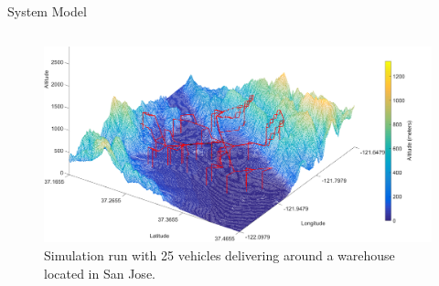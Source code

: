 \documentclass[final]{beamer}
\newlength{\onecolwid}
\newlength{\twocolwid}
\begin{document}
\begin{frame}[t]
\begin{columns}[t]
\begin{column}{\twocolwid}
\begin{columns}[t,totalwidth=\twocolwid]
\begin{column}{\onecolwid}
\begin{block}{System Model}
{\small\par}

\end{block}


%
%
%
%
%


\end{column} %

\end{columns} %



{\small\par}

\begin{figure}
\includegraphics[width=1\linewidth]{images/poster_terrain.png}
\caption{Simulation run with 25 vehicles delivering around a warehouse located in San Jose.}
\end{figure}



\end{column}
\end{columns}
\end{frame}
\end{document}
